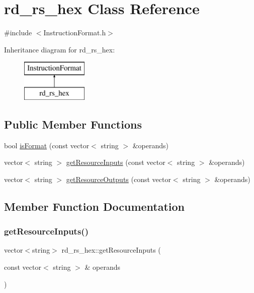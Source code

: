 \hypertarget{classrd__rs__hex}{}\section{rd\+\_\+rs\+\_\+hex Class Reference}
\label{classrd__rs__hex}


{\ttfamily \#include $<$Instruction\+Format.\+h$>$}

Inheritance diagram for rd\+\_\+rs\+\_\+hex\+:\begin{figure}[H]
\begin{center}
\leavevmode
\includegraphics[height=2.000000cm]{classrd__rs__hex}
\end{center}
\end{figure}
\subsection*{Public Member Functions}
\begin{DoxyCompactItemize}
\item 
bool \hyperlink{classrd__rs__hex_ae39510e90b575861fdaa315308ef8638}{is\+Format} (const vector$<$ string $>$ \&operands)
\item 
vector$<$ string $>$ \hyperlink{classrd__rs__hex_acef60c9ce93239e4cfcdadbe65355782}{get\+Resource\+Inputs} (const vector$<$ string $>$ \&operands)
\item 
vector$<$ string $>$ \hyperlink{classrd__rs__hex_a268da92bc87148bd3f8f5b0086a442f5}{get\+Resource\+Outputs} (const vector$<$ string $>$ \&operands)
\end{DoxyCompactItemize}


\subsection{Member Function Documentation}
\mbox{\label{classrd__rs__hex_acef60c9ce93239e4cfcdadbe65355782}} 
\subsubsection{\texorpdfstring{get\+Resource\+Inputs()}{getResourceInputs()}}
{\footnotesize\ttfamily vector$<$string$>$ rd\+\_\+rs\+\_\+hex\+::get\+Resource\+Inputs (\begin{DoxyParamCaption}\item[{const vector$<$ string $>$ \&}]{operands }\end{DoxyParamCaption})\hspace{0.3cm}{\ttfamily [virtual]}}

